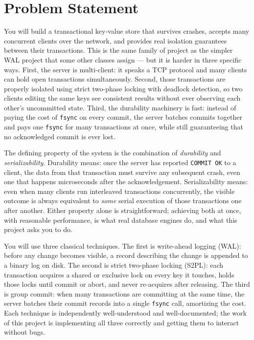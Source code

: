 \documentclass[11pt,a4paper]{article}
\begin{document}

\section{Problem Statement}

You will build a transactional key-value store that survives crashes, accepts many concurrent clients over the network, and provides real isolation guarantees between their transactions. This is the same family of project as the simpler WAL project that some other classes assign --- but it is harder in three specific ways. First, the server is multi-client: it speaks a TCP protocol and many clients can hold open transactions simultaneously. Second, those transactions are properly isolated using strict two-phase locking with deadlock detection, so two clients editing the same keys see consistent results without ever observing each other's uncommitted state. Third, the durability machinery is fast: instead of paying the cost of \texttt{fsync} on every commit, the server batches commits together and pays one \texttt{fsync} for many transactions at once, while still guaranteeing that no acknowledged commit is ever lost.

The defining property of the system is the combination of \textit{durability} and \textit{serializability}. Durability means: once the server has reported \texttt{COMMIT OK} to a client, the data from that transaction must survive any subsequent crash, even one that happens microseconds after the acknowledgement. Serializability means: even when many clients run interleaved transactions concurrently, the visible outcome is always equivalent to \textit{some} serial execution of those transactions one after another. Either property alone is straightforward; achieving both at once, with reasonable performance, is what real database engines do, and what this project asks you to do.

You will use three classical techniques. The first is write-ahead logging (WAL): before any change becomes visible, a record describing the change is appended to a binary log on disk. The second is strict two-phase locking (S2PL): each transaction acquires a shared or exclusive lock on every key it touches, holds those locks until commit or abort, and never re-acquires after releasing. The third is group commit: when many transactions are committing at the same time, the server batches their commit records into a single \texttt{fsync} call, amortizing the cost. Each technique is independently well-understood and well-documented; the work of this project is implementing all three correctly and getting them to interact without bugs.
\end{document}
